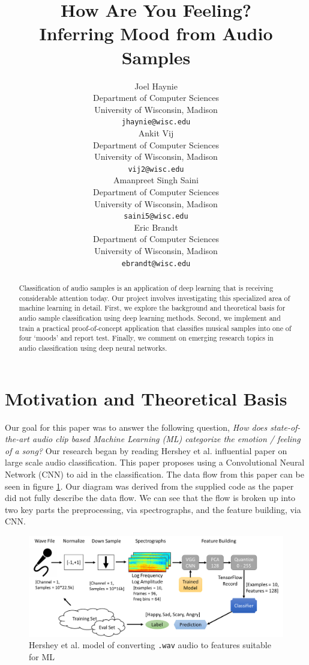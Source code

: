 \documentclass{article}
\title{How Are You Feeling? \\ Inferring Mood from Audio Samples}
\author{
  Joel Haynie \\
  Department of Computer Sciences\\
  University of Wisconsin, Madison\\
  \texttt{jhaynie@wisc.edu} \\
  \And
  Ankit Vij \\
  Department of Computer Sciences\\
  University of Wisconsin, Madison\\
  \texttt{vij2@wisc.edu} \\
  \AND
  Amanpreet Singh Saini \\
  Department of Computer Sciences\\
  University of Wisconsin, Madison\\
  \texttt{saini5@wisc.edu} \\
  \And
  Eric Brandt \\
  Department of Computer Sciences\\
  University of Wisconsin, Madison\\
  \texttt{ebrandt@wisc.edu}
}
\begin{document}

\maketitle

\begin{abstract}
Classification of audio samples is an application of deep learning that is receiving considerable attention today. Our project involves investigating this specialized area of machine learning in detail. First, we explore the background and theoretical basis for audio sample classification using deep learning methods. Second, we implement and train a practical proof-of-concept application that classifies musical samples into one of four ‘moods’ and report test. Finally, we comment on emerging research topics in audio classification using deep neural networks.
\end{abstract}

\section{Motivation and Theoretical Basis}\label{sec:theory}

Our goal for this paper was to answer the following question, \textit{How does state-of-the-art audio clip based Machine Learning (ML) categorize the emotion / feeling of a song?}   Our research began by reading Hershey et al. \cite{hershey} influential paper on large scale audio classification.  This paper proposes using a Convolutional Neural Network (CNN) to aid in the classification.  The data flow from this paper can be seen in figure \ref{fig:vgg_flow}.  Our diagram was derived from the supplied code as the paper did not fully describe the data flow.  We can see that the flow is broken up into two key parts the preprocessing, via spectrographs, and the feature building, via CNN. 

\begin{figure}[!htb]
	\centering
	\includegraphics[width=1.0\textwidth]{VGG Flow.png}  
	\caption{Hershey et al. \cite{hershey} model of converting \texttt{.wav} audio to features suitable for ML}
	\label{fig:vgg_flow}
\end{figure}
\end{document}
